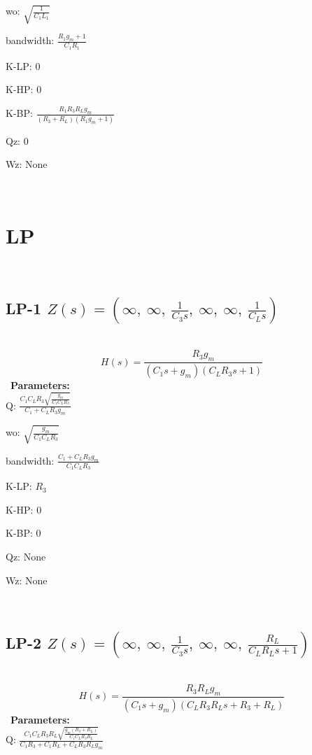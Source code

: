 \documentclass{article}
\begin{document}
wo: $\sqrt{\frac{1}{C_{1} L_{1}}}$\ 

bandwidth: $\frac{R_{1} g_{m} + 1}{C_{1} R_{1}}$\ 

K-LP: $0$\ 

K-HP: $0$\ 

K-BP: $\frac{R_{1} R_{3} R_{L} g_{m}}{\left(R_{3} + R_{L}\right) \left(R_{1} g_{m} + 1\right)}$\ 

Qz: $0$\ 

Wz: $\text{None}$\ 

\ 

\section{LP}\ 
\subsection{LP-1 $Z(s) = \left( \infty, \  \infty, \  \frac{1}{C_{3} s}, \  \infty, \  \infty, \  \frac{1}{C_{L} s}\right)$ } \ 
\textbf{\[H(s) = \frac{R_{3} g_{m}}{\left(C_{1} s + g_{m}\right) \left(C_{L} R_{3} s + 1\right)}\] } \ 
\textbf{Parameters:}\\ 

Q: $\frac{C_{1} C_{L} R_{3} \sqrt{\frac{g_{m}}{C_{1} C_{L} R_{3}}}}{C_{1} + C_{L} R_{3} g_{m}}$\ 

wo: $\sqrt{\frac{g_{m}}{C_{1} C_{L} R_{3}}}$\ 

bandwidth: $\frac{C_{1} + C_{L} R_{3} g_{m}}{C_{1} C_{L} R_{3}}$\ 

K-LP: $R_{3}$\ 

K-HP: $0$\ 

K-BP: $0$\ 

Qz: $\text{None}$\ 

Wz: $\text{None}$\ 

\ 

\subsection{LP-2 $Z(s) = \left( \infty, \  \infty, \  \frac{1}{C_{3} s}, \  \infty, \  \infty, \  \frac{R_{L}}{C_{L} R_{L} s + 1}\right)$ } \ 
\textbf{\[H(s) = \frac{R_{3} R_{L} g_{m}}{\left(C_{1} s + g_{m}\right) \left(C_{L} R_{3} R_{L} s + R_{3} + R_{L}\right)}\] } \ 
\textbf{Parameters:}\\ 

Q: $\frac{C_{1} C_{L} R_{3} R_{L} \sqrt{\frac{g_{m} \left(R_{3} + R_{L}\right)}{C_{1} C_{L} R_{3} R_{L}}}}{C_{1} R_{3} + C_{1} R_{L} + C_{L} R_{3} R_{L} g_{m}}$\ 
\end{document}
